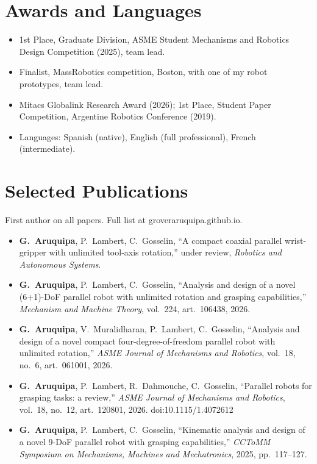 \documentclass[10pt,a4paper]{article}
\begin{document}
\section{Awards and Languages}
\begin{itemize}
\item 1st Place, Graduate Division, ASME Student Mechanisms and Robotics Design Competition (2025), team lead.
\item Finalist, MassRobotics competition, Boston, with one of my robot prototypes, team lead.
\item Mitacs Globalink Research Award (2026); 1st Place, Student Paper Competition, Argentine Robotics Conference (2019).
\item Languages: Spanish (native), English (full professional), French (intermediate).
\end{itemize}

\newpage
\section{Selected Publications}
{\small First author on all papers. Full list at groveraruquipa.github.io.}\par\vspace{2pt}
\begin{itemize}
\item \textbf{G.~Aruquipa}, P.~Lambert, C.~Gosselin, ``A compact coaxial parallel wrist-gripper with unlimited tool-axis rotation,'' under review, \emph{Robotics and Autonomous Systems}.
\item \textbf{G.~Aruquipa}, P.~Lambert, C.~Gosselin, ``Analysis and design of a novel (6+1)-DoF parallel robot with unlimited rotation and grasping capabilities,'' \emph{Mechanism and Machine Theory}, vol.~224, art.~106438, 2026.
\item \textbf{G.~Aruquipa}, V.~Muralidharan, P.~Lambert, C.~Gosselin, ``Analysis and design of a novel compact four-degree-of-freedom parallel robot with unlimited rotation,'' \emph{ASME Journal of Mechanisms and Robotics}, vol.~18, no.~6, art.~061001, 2026.
\item \textbf{G.~Aruquipa}, P.~Lambert, R.~Dahmouche, C.~Gosselin, ``Parallel robots for grasping tasks: a review,'' \emph{ASME Journal of Mechanisms and Robotics}, vol.~18, no.~12, art.~120801, 2026. doi:10.1115/1.4072612
\item \textbf{G.~Aruquipa}, P.~Lambert, C.~Gosselin, ``Kinematic analysis and design of a novel 9-DoF parallel robot with grasping capabilities,'' \emph{CCToMM Symposium on Mechanisms, Machines and Mechatronics}, 2025, pp.~117--127.
\end{itemize}
\end{document}
